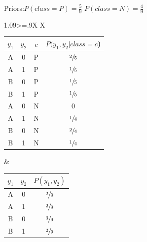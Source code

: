\documentclass[11pt,a4paper]{article}
\begin{document}
\begin{flushleft}
  Priors:\hspace{5mm}$ P(class = P) = \frac{5}{9} $ \hspace{5mm} $ P(class = N) = \frac{4}{9} $ \par
  \vspace{5mm}
  \begin{tabularx}{1.09\textwidth}{>{\hsize=.9\hsize}X X}
     \par
    \vspace{2.5mm}\begin{tabular}{cccc}
                    $y_1$ & $y_2$ & $c$ & $P(y_1,y_2|class = c$) \\ \hline
                    A     & 0     & P   & $\sfrac{2}{5}$         \\ \hline
                    A     & 1     & P   & $\sfrac{1}{5}$         \\ \hline
                    B     & 0     & P   & $\sfrac{1}{5}$         \\ \hline
                    B     & 1     & P   & $\sfrac{1}{5}$         \\ \hline
                    A     & 0     & N   & $0$                    \\ \hline
                    A     & 1     & N   & $\sfrac{1}{4}$         \\ \hline
                    B     & 0     & N   & $\sfrac{2}{4}$         \\ \hline
                    B     & 1     & N   & $\sfrac{1}{4}$
                  \end{tabular}
     &
     \par
    \vspace{2.5mm}\begin{tabular}{ccc}
                    $y_1$ & $y_2$ & $P(y_1,y_2)$   \\ \hline
                    A     & 0     & $\sfrac{2}{9}$ \\ \hline
                    A     & 1     & $\sfrac{2}{9}$ \\ \hline
                    B     & 0     & $\sfrac{3}{9}$ \\ \hline
                    B     & 1     & $\sfrac{2}{9}$ \\
                  \end{tabular}
  \end{tabularx}


\end{flushleft}
\end{document}

